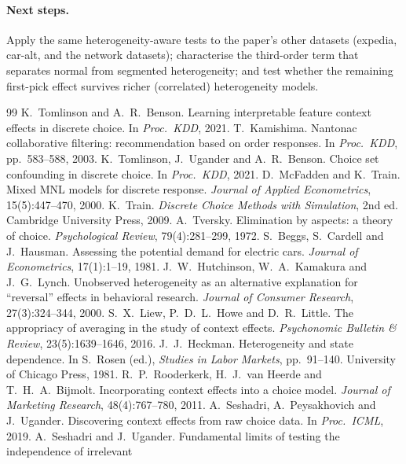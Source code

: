 \documentclass[11pt,a4paper]{article}
\theoremstyle{remark}
\begin{document}
\paragraph{Next steps.}
Apply the same heterogeneity-aware tests to the paper's other datasets (expedia, car-alt, and the network
datasets); characterise the third-order term that separates normal from segmented heterogeneity; and test
whether the remaining first-pick effect survives richer (correlated) heterogeneity models.

\begin{thebibliography}{99}\small
{} K.~Tomlinson and A.~R.~Benson. Learning interpretable feature context effects in discrete
  choice. In \emph{Proc.\ KDD}, 2021.
 T.~Kamishima. Nantonac collaborative filtering: recommendation based on order
  responses. In \emph{Proc.\ KDD}, pp.~583--588, 2003.
 K.~Tomlinson, J.~Ugander and A.~R.~Benson. Choice set confounding in discrete choice. In
  \emph{Proc.\ KDD}, 2021.
 D.~McFadden and K.~Train. Mixed MNL models for discrete response. \emph{Journal of
  Applied Econometrics}, 15(5):447--470, 2000.
 K.~Train. \emph{Discrete Choice Methods with Simulation}, 2nd ed. Cambridge University
  Press, 2009.
 A.~Tversky. Elimination by aspects: a theory of choice. \emph{Psychological Review},
  79(4):281--299, 1972.
 S.~Beggs, S.~Cardell and J.~Hausman. Assessing the potential demand for electric cars.
  \emph{Journal of Econometrics}, 17(1):1--19, 1981.
 J.~W.~Hutchinson, W.~A.~Kamakura and J.~G.~Lynch. Unobserved heterogeneity as an
  alternative explanation for ``reversal'' effects in behavioral research. \emph{Journal of Consumer
  Research}, 27(3):324--344, 2000.
 S.~X.~Liew, P.~D.~L.~Howe and D.~R.~Little. The appropriacy of averaging in the study of
  context effects. \emph{Psychonomic Bulletin \& Review}, 23(5):1639--1646, 2016.
 J.~J.~Heckman. Heterogeneity and state dependence. In S.~Rosen (ed.), \emph{Studies in
  Labor Markets}, pp.~91--140. University of Chicago Press, 1981.
 R.~P.~Rooderkerk, H.~J.~van Heerde and T.~H.~A.~Bijmolt. Incorporating context effects into
  a choice model. \emph{Journal of Marketing Research}, 48(4):767--780, 2011.
 A.~Seshadri, A.~Peysakhovich and J.~Ugander. Discovering context effects from raw choice
  data. In \emph{Proc.\ ICML}, 2019.
 A.~Seshadri and J.~Ugander. Fundamental limits of testing the independence of irrelevant

\end{thebibliography}
\end{document}
